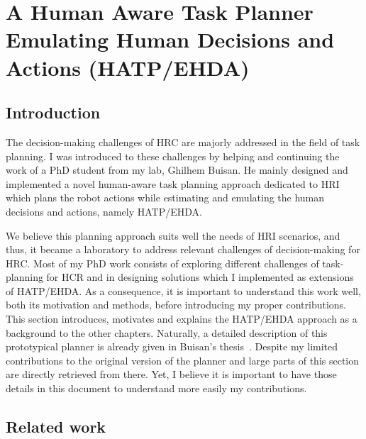 \ifdefined{}
\else
\setcounter{chapter}{1} %
\dominitoc
\faketableofcontents
\fi

\chapter{A Human Aware Task Planner Emulating Human Decisions and Actions (HATP/EHDA)}
\label{chap:2}
\minitoc

\section{Introduction}

The decision-making challenges of HRC are majorly addressed in the field of task planning. I was introduced to these challenges by helping and continuing the work of a PhD student from my lab, Ghilhem Buisan. He mainly designed and implemented a novel human-aware task planning approach dedicated to HRI which plans the robot actions while estimating and emulating the human decisions and actions, namely HATP/EHDA. 

We believe this planning approach suits well the needs of HRI scenarios, and thus, it became a laboratory to address relevant challenges of decision-making for HRC. Most of my PhD work consists of exploring different challenges of task-planning for HCR and in designing solutions which I implemented as extensions of HATP/EHDA. As a consequence, it is important to understand this work well, both its motivation and methods, before introducing my proper contributions. This section introduces, motivates and explains the HATP/EHDA approach as a background to the other chapters. 
Naturally, a detailed description of this prototypical planner is already given in Buisan's thesis~\cite{thesisBuisan21}. Despite my limited contributions to the original version of the planner and large parts of this section are directly retrieved from there. Yet, I believe it is important to have those details in this document to understand more easily my contributions.  

\section{Related work}

